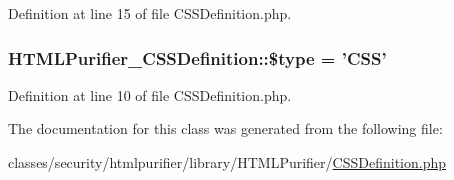 Definition at line 15 of file C\+S\+S\+Definition.\+php.

\hypertarget{classHTMLPurifier__CSSDefinition_ac4de0630820d8d83f555ab4eb9b9e6e6}{
\subsubsection[{\$type}]{\setlength{\rightskip}{0pt plus 5cm}H\+T\+M\+L\+Purifier\+\_\+\+C\+S\+S\+Definition\+::\$type = 'C\+S\+S'}}\label{classHTMLPurifier__CSSDefinition_ac4de0630820d8d83f555ab4eb9b9e6e6}


Definition at line 10 of file C\+S\+S\+Definition.\+php.



The documentation for this class was generated from the following file\+:\begin{DoxyCompactItemize}
\item 
classes/security/htmlpurifier/library/\+H\+T\+M\+L\+Purifier/\hyperlink{CSSDefinition_8php}{C\+S\+S\+Definition.\+php}\end{DoxyCompactItemize}

